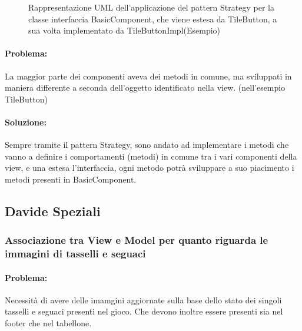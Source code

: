 \begin{figure}[ht]
    \caption{Rappresentazione UML dell'applicazione del pattern Strategy per la classe interfaccia BasicComponent, che viene estesa da TileButton, a sua volta implementato da TileButtonImpl(Esempio)}
\end{figure}

\paragraph{Problema:}
La maggior parte dei componenti aveva dei metodi in comune, ma sviluppati in maniera differente a seconda dell'oggetto identificato nella view. (nell'esempio TileButton)
\paragraph{Soluzione:}
Sempre tramite il pattern Strategy, sono andato ad implementare i metodi che vanno a definire i comportamenti (metodi) in comune tra i vari componenti della view, e una estesa l'interfaccia, ogni metodo potrà sviluppare a suo piacimento i metodi presenti in BasicComponent.

\subsection*{Davide Speziali}


\subsubsection*{Associazione tra View e Model per quanto riguarda le immagini di tasselli e seguaci}
\paragraph{Problema:}
Necessità di avere delle imamgini aggiornate sulla base dello stato dei singoli tasselli e seguaci presenti nel gioco. Che devono inoltre essere presenti
sia nel footer che nel tabellone.
